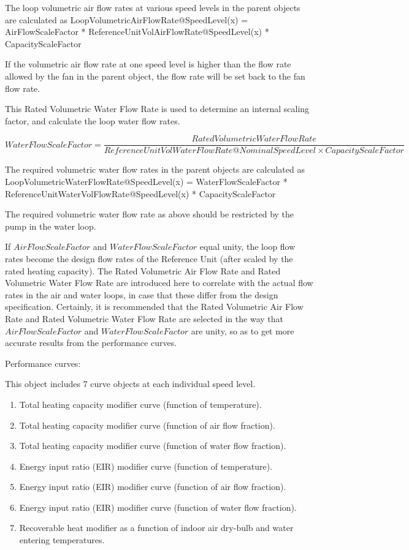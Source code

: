 The loop volumetric air flow rates at various speed levels in the parent objects are calculated as LoopVolumetricAirFlowRate@SpeedLevel(x) = AirFlowScaleFactor * ReferenceUnitVolAirFlowRate@SpeedLevel(x) * CapacityScaleFactor

If the volumetric air flow rate at one speed level is higher than the flow rate allowed by the fan in the parent object, the flow rate will be set back to the fan flow rate.

This Rated Volumetric Water Flow Rate is used to determine an internal scaling factor, and calculate the loop water flow rates.

{\scriptsize
\begin{equation}
WaterFlowScaleFactor = \frac{{RatedVolumetricWaterFlowRate}}{{ReferenceUnitVolWaterFlowRate@NominalSpeedLevel \times CapacityScaleFactor}}
\end{equation}}

The required volumetric water flow rates in the parent objects are calculated as LoopVolumetricWaterFlowRate@SpeedLevel(x) = WaterFlowScaleFactor * ReferenceUnitWaterVolFlowRate@SpeedLevel(x) * CapacityScaleFactor

The required volumetric water flow rate as above should be restricted by the pump in the water loop.

If \(AirFlowScaleFactor\) and \(WaterFlowScaleFactor\) equal unity, the loop flow rates become the design flow rates of the Reference Unit (after scaled by the rated heating capacity). The Rated Volumetric Air Flow Rate and Rated Volumetric Water Flow Rate are introduced here to correlate with the actual flow rates in the air and water loops, in case that these differ from the design specification. Certainly, it is recommended that the Rated Volumetric Air Flow Rate and Rated Volumetric Water Flow Rate are selected in the way that \(AirFlowScaleFactor\) and \(WaterFlowScaleFactor\) are unity, so as to get more accurate results from the performance curves.

Performance curves:

This object includes 7 curve objects at each individual speed level.

\begin{enumerate}
\def\labelenumi{\arabic{enumi})}
\item Total heating capacity modifier curve (function of temperature).
\item Total heating capacity modifier curve (function of air flow fraction).
\item Total heating capacity modifier curve (function of water flow fraction).
\item Energy input ratio (EIR) modifier curve (function of temperature).
\item Energy input ratio (EIR) modifier curve (function of air flow fraction).
\item Energy input ratio (EIR) modifier curve (function of water flow fraction).
\item Recoverable heat modifier as a function of indoor air dry-bulb and water entering temperatures.
\end{enumerate}

